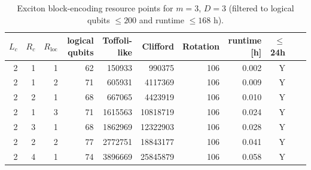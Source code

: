 \begin{table}[t]
\centering
\scriptsize
\caption{Exciton block-encoding resource points for $m=3$, $D=3$ (filtered to logical qubits $\leq 200$ and runtime $\leq 168$ h).}
\begin{tabularx}{\linewidth}{rrrrrrrrrrr}
\toprule
$L_c$ & $R_c$ & $R_{\mathrm{loc}}$ & logical qubits & Toffoli-like & Clifford & Rotation & runtime [h] & $\leq$ 24h \\
\midrule
2 & 1 & 1 & 62 & 150933 & 990375 & 106 & 0.002 & Y \\
2 & 1 & 2 & 71 & 605931 & 4117369 & 106 & 0.009 & Y \\
2 & 2 & 1 & 68 & 667065 & 4423919 & 106 & 0.010 & Y \\
2 & 1 & 3 & 71 & 1615563 & 10818719 & 106 & 0.024 & Y \\
2 & 3 & 1 & 68 & 1862969 & 12322903 & 106 & 0.028 & Y \\
2 & 2 & 2 & 77 & 2772751 & 18843177 & 106 & 0.041 & Y \\
2 & 4 & 1 & 74 & 3896669 & 25845879 & 106 & 0.058 & Y \\
\bottomrule
\end{tabularx}
\end{table}
